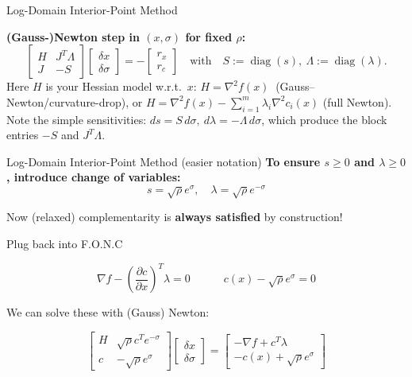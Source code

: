 \begin{frame}{Log-Domain Interior-Point Method}

\textbf{(Gauss-)Newton step in \((x,\sigma)\) for fixed \(\rho\):}
\[
\begin{bmatrix}
H & J^{\!T}\Lambda \\[2pt]
J & -S
\end{bmatrix}
\begin{bmatrix}
\delta x \\ \delta \sigma
\end{bmatrix}
=
-
\begin{bmatrix}
r_x \\ r_c
\end{bmatrix}
\quad\text{with}\quad
S:=\operatorname{diag}(s),\ \Lambda:=\operatorname{diag}(\lambda).
\]
{\footnotesize
Here \(H\) is your Hessian model w.r.t.\ \(x\):
\(
H=\nabla^2 f(x)\ \) (Gauss--Newton/curvature-drop), 
or 
\(
H=\nabla^2 f(x)-\sum_{i=1}^m \lambda_i \nabla^2 c_i(x)
\) (full Newton). 
Note the simple sensitivities:
\(ds = S\,d\sigma,\ d\lambda = -\Lambda\,d\sigma\), 
which produce the block entries \(-S\) and \(J^{\!T}\Lambda\).
}

\end{frame}




\begin{frame}{Log-Domain Interior-Point Method (easier notation)}
\textbf{To ensure $s \geq 0$ and $\lambda \geq 0$, introduce change of variables:} $$s = \sqrt{\rho} e^{\sigma}, \quad \lambda = \sqrt{\rho} e^{-\sigma}$$

Now (relaxed) complementarity is \textbf{always satisfied} by construction!

Plug back into F.O.N.C

$$
\nabla f - \left(\frac{\partial c}{\partial x}\right)^T \lambda = 0 \quad \quad \quad c(x) - \sqrt{\rho} e^{\sigma} = 0
$$

We can solve these with (Gauss) Newton:

$$
\begin{bmatrix}
H & \sqrt{\rho} c^T e^{-\sigma} \\
c & -\sqrt{\rho} e^{\sigma}
\end{bmatrix}
\begin{bmatrix}
\delta x \\ \delta \sigma
\end{bmatrix}
=
\begin{bmatrix}
-\nabla f + c^T \lambda \\ -c(x) + \sqrt{\rho} e^{\sigma}
\end{bmatrix}
$$



\end{frame}






